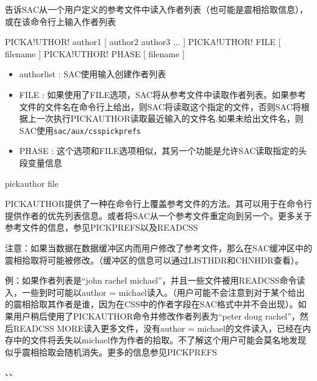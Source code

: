 \label{cmd:pickauthor}

告诉SAC从一个用户定义的参考文件中读入作者列表（也可能是震相拾取信息），或在该命令行上输入作者列表

\begin{SACSTX}
PICKA!UTHOR! author1 [ author2 author3 ... ]
PICKA!UTHOR! FILE [ filename ]
PICKA!UTHOR! PHASE [ filename ]
\end{SACSTX}

\begin{itemize}
\item authorlist : SAC使用输入创建作者列表 
\item FILE : 如果使用了FILE选项，SAC将从参考文件中读取作者列表。如果参考文件的文件名在命令行上给出，则SAC将读取这个指定的文件，否则SAC将根据上一次执行PICKAUTHOR读取最近输入的文件名.如果未给出文件名，则SAC使用\texttt{sac/aux/csspickprefs}
\item PHASE : 这个选项和FILE选项相似，其另一个功能是允许SAC读取指定的头段变量信息 
\end{itemize}

\begin{SACDFT}
pickauthor file
\end{SACDFT}

PICKAUTHOR提供了一种在命令行上覆盖参考文件的方法。其可以用于在命令行提供作者的优先列表信息。或者将SAC从一个参考文件重定向到另一个。更多关于参考文件的信息，参见PICKPREFS以及READCSS

注意：如果当数据在数据缓冲区内而用户修改了参考文件，那么在SAC缓冲区中的震相拾取将可能被修改。（缓冲区的信息可以通过LISTHDR和CHNHDR查看）。

例：如果作者列表是``john rachel michael''，并且一些文件被用READCSS命令读入，一些到时可能以author = michael读入。（用户可能不会注意到对于某个给出的震相拾取其作者是谁，因为在CSS中的作者字段在SAC格式中并不会出现）。如果用户稍后使用了PICKAUTHOR命令并修改作者列表为``peter doug rachel''，然后READCSS MORE读入更多文件，没有author = michael的文件读入，已经在内存中的文件将丢失以michael作为作者的拾取。不了解这个用户可能会莫名地发现似乎震相拾取会随机消失。更多的信息参见PICKPREFS

、、
